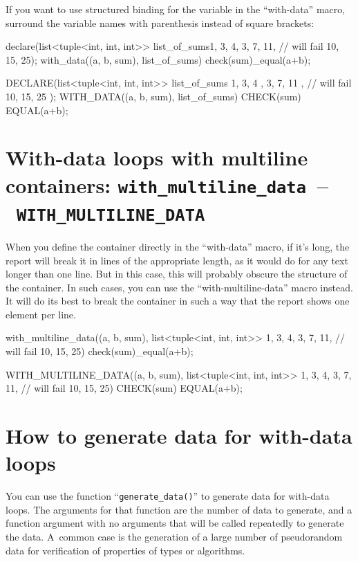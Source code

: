 \documentclass[twoside, a4paper, article]{memoir}
\newcommand*\testudocolor{\color{red!80!blue}}
\newcommand*\testudo[1]{\texttt{\testudocolor{}#1}}
\newcommand*\testudopair[2]{\testudo{#1}~--~\testudo{#2}}
\newcommand\sectiontestudopair[3]{%
  \section[#1]{#1: \testudopair{#2}{#3}}}
\begin{document}
If you want to use structured binding for the variable in the ``with-data''
macro, surround the variable names with parenthesis instead of square brackets:
\begin{cpplisting}
declare(list<tuple<int, int, int>>
          list_of_sums{{1, 3, 4},
                       {3, 7, 11}, // will fail
                       {10, 15, 25}});
with_data((a, b, sum), list_of_sums)
  check(sum)_equal(a+b);
\end{cpplisting}

\begin{cpplisting}
DECLARE(list<tuple<int, int, int>>
          list_of_sums{ { 1, 3, 4 },
                        { 3, 7, 11 }, // will fail
                        { 10, 15, 25 } });
WITH_DATA((a, b, sum), list_of_sums)
  CHECK(sum) EQUAL(a+b);
\end{cpplisting}

\sectiontestudopair{With-data loops with multiline containers}%
  {with\_multiline\_data}{WITH\_MULTILINE\_DATA}

When you define the container directly in the ``with-data'' macro, if it's
long, the report will break it in lines of the appropriate length, as it would
do for any text longer than one line.  But in this case, this will probably
obscure the structure of the container.  In such cases, you can use the
``with-multiline-data'' macro instead.  It will do its best to break the
container in such a way that the report shows one element per line.

\begin{cpplisting}
with_multiline_data((a, b, sum), list<tuple<int, int, int>>{
    {1, 3, 4},
    {3, 7, 11}, // will fail
    {10, 15, 25}})
  check(sum)_equal(a+b);
\end{cpplisting}

\begin{cpplisting}
WITH_MULTILINE_DATA((a, b, sum), list<tuple<int, int, int>>{
    {1, 3, 4},
    {3, 7, 11}, // will fail
    {10, 15, 25}})
  CHECK(sum) EQUAL(a+b);
\end{cpplisting}

\section{How to generate data for with-data loops}
\label{sec:generate-data-with-data-loops}

You can use the function ``\texttt{generate\_data()}'' to generate data for
with-data loops.  The arguments for that function are the number of data to
generate, and a function argument with no arguments that will be called
repeatedly to generate the data.  A~common case is the generation of a large
number of pseudorandom data for verification of properties of types or
algorithms.
\end{document}
